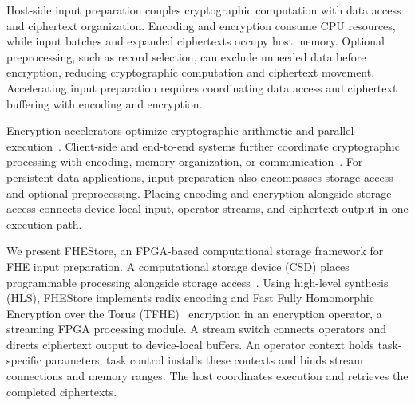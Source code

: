 \documentclass[sigconf,anonymous,balance=false]{acmart}
\newcommand{\bodypar}{\par\vskip 0pt plus 6pt\relax}
\begin{document}
Host-side input preparation couples cryptographic computation with data access and ciphertext organization. Encoding and encryption consume CPU resources, while input batches and expanded ciphertexts occupy host memory. Optional preprocessing, such as record selection, can exclude unneeded data before encryption, reducing cryptographic computation and ciphertext movement. Accelerating input preparation requires coordinating data access and ciphertext buffering with encoding and encryption.
\bodypar

Encryption accelerators optimize cryptographic arithmetic and parallel execution~\cite{mert2020bfv,lee2023ckks,feryputri2025lwe,syafalni2026multicore}. Client-side and end-to-end systems further coordinate cryptographic processing with encoding, memory organization, or communication~\cite{krieger2024aloha,yune2025abcfhe,vanderhagen2022choco,gupta2024memfhe}. For persistent-data applications, input preparation also encompasses storage access and optional preprocessing. Placing encoding and encryption alongside storage access connects device-local input, operator streams, and ciphertext output in one execution path.
\bodypar

We present FHEStore, an FPGA-based computational storage framework for FHE input preparation. A computational storage device (CSD) places programmable processing alongside storage access~\cite{snia2025csmodel,ruan2019insider,wong2024dongle,woods2014ibex}. Using high-level synthesis (HLS), FHEStore implements radix encoding and Fast Fully Homomorphic Encryption over the Torus (TFHE)~\cite{chillotti2020tfhe} encryption in an encryption operator, a streaming FPGA processing module. A stream switch connects operators and directs ciphertext output to device-local buffers. An operator context holds task-specific parameters; task control installs these contexts and binds stream connections and memory ranges. The host coordinates execution and retrieves the completed ciphertexts.
\bodypar
\end{document}
